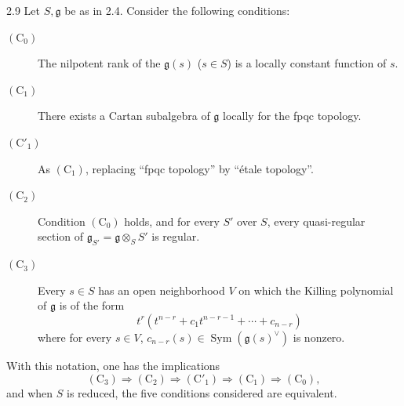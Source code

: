 \begin{proposition}{2.9}\label{XIV.2.9}
Let $S,\mathfrak g$ be as in 2.4. Consider the following conditions:
\begin{description}
\item[$(\mathrm C_0)$] The nilpotent rank of the $\mathfrak g(s)$
($s\in S$) is a locally constant function of $s$.
\item[$(\mathrm C_1)$] There exists a Cartan subalgebra of
$\mathfrak g$ locally for the fpqc topology.
\item[$(\mathrm C'_1)$] As $(\mathrm C_1)$, replacing ``fpqc
topology'' by ``\'etale topology''.
\item[$(\mathrm C_2)$] Condition $(\mathrm C_0)$ holds, and
for every $S'$ over $S$, every quasi-regular section of
$\mathfrak g_{S'}=\mathfrak g\otimes_S S'$ is regular.
\item[$(\mathrm C_3)$] Every $s\in S$ has an open neighborhood
$V$ on which the Killing polynomial of $\mathfrak g$ is of
the form
\[
 t^r(t^{n-r}+c_1t^{n-r-1}+\cdots+c_{n-r})
\]
where for every $s\in V$, $c_{n-r}(s)\in
\operatorname{Sym}(\mathfrak g(s)^\vee)$ is nonzero.
\end{description}
With this notation, one has the implications
\[
 (\mathrm C_3)\Rightarrow(\mathrm C_2)\Rightarrow(\mathrm C'_1)
 \Rightarrow(\mathrm C_1)\Rightarrow(\mathrm C_0),
\]
and when $S$ is reduced, the five conditions considered are equivalent.
\end{proposition}
